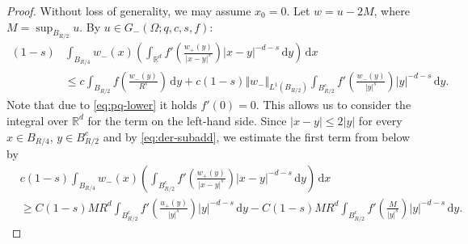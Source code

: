 \documentclass[11pt]{amsart}
\theoremstyle{plain}
\theoremstyle{definition}
\numberwithin{equation}{section}
\newcommand{\dx} {\,\mathrm{d}x}
\newcommand{\dy} {\,\mathrm{d}y}
\newcommand{\R}{\mathbb{R}}
\begin{document}
\begin{proof}
Without loss of generality, we may assume $x_0=0$. Let $w = u - 2M$, where $M = \sup_{B_{R/2}} u$. By $u \in G_-(\Omega;q,c,s,f)$:
\begin{equation}
\label{eq:maintail}
\begin{split}
(1-s)&\int_{B_{R/4}} w_-(x) \left( \int_{\R^d} f' \left( \frac{w_+(y)}{\vert x-y \vert^s} \right)\vert x-y \vert^{-d-s} \dy \right) \dx\\
&\le c \int_{B_{R/2}} f \left( \frac{w_-(y)}{R^s}\right) \dy + c (1-s) \Vert w_-\Vert_{L^1(B_{R/2})}\int_{B_{R/2}^c} f' \left( \frac{w_-(y)}{|y|^s} \right) |y|^{-d-s} \dy.
\end{split}
\end{equation}
Note that due to \eqref{eq:pq-lower} it holds $f'(0) = 0$. This allows us to consider the integral over $\R^d$ for the term on the left-hand side.
Since $|x-y| \le 2|y|$ for every $x \in B_{R/4}$, $y \in B_{R/2}^c$ and by \eqref{eq:der-subadd}, we estimate the first term from below by
\begin{align*}
&c(1-s)\int_{B_{R/4}} w_-(x) \left( \int_{B_{R/2}^{c}} f' \left( \frac{w_+(y)}{\vert x-y \vert^s} \right)\vert x-y \vert^{-d-s} \dy \right) \dx \\
&\ge C(1-s)M R^d \int_{B_{R/2}^{c}} f' \left( \frac{u_+(y)}{\vert y \vert^s} \right)\vert y \vert^{-d-s} \dy - C (1-s) M R^d \int_{B_{R/2}^{c}} f' \left( \frac{M}{\vert y \vert^s} \right)\vert y \vert^{-d-s} \dy.
\end{align*}


\end{proof}
\end{document}
